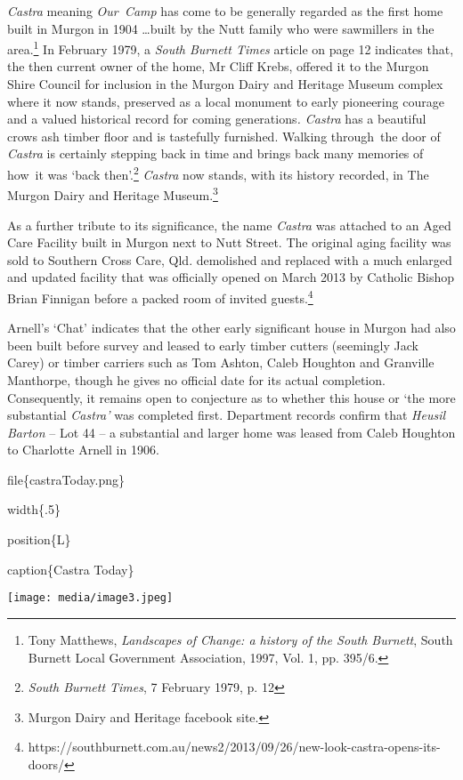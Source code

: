 \emph{Castra} meaning \emph{Our~Camp} has come to be generally regarded
as the first home built in Murgon in 1904 \ldots built by the Nutt
family who were sawmillers in the area.\footnote{Tony Matthews,
  \emph{Landscapes of Change: a history of the South Burnett}, South
  Burnett Local Government Association, 1997, Vol. 1, pp. 395/6.} In
February 1979, a \emph{South Burnett Times} article on page 12 indicates
that, the then current owner of the home, Mr Cliff Krebs, offered it to
the Murgon Shire Council for inclusion in the Murgon Dairy and Heritage
Museum complex where it now stands, preserved as a local monument to
early pioneering courage and a valued historical record for coming
generations\emph{. Castra} has a beautiful crows ash timber floor and is
tastefully furnished. Walking through~the door of \emph{Castra} is
certainly stepping back in time and brings back many memories of how~it
was `back then'.\footnote{\emph{South Burnett Times}, 7 February 1979,
  p. 12} \emph{Castra} now stands, with its history recorded, in The
Murgon Dairy and Heritage Museum.\footnote{Murgon Dairy and Heritage
  facebook site.}

As a further tribute to its significance, the name \emph{Castra} was
attached to an Aged Care Facility built in Murgon next to Nutt Street.
The original aging facility was sold to Southern Cross Care, Qld.
demolished and replaced with a much enlarged and updated facility that
was officially opened on March 2013 by Catholic Bishop Brian Finnigan
before a packed room of invited guests.\footnote{https://southburnett.com.au/news2/2013/09/26/new-look-castra-opens-its-doors/}

Arnell's `Chat' indicates that the other early significant house in
Murgon had also been built before survey and leased to early timber
cutters (seemingly Jack Carey) or timber carriers such as Tom Ashton,
Caleb Houghton and Granville Manthorpe, though he gives no official date
for its actual completion. Consequently, it remains open to conjecture
as to whether this house or `the more substantial \emph{Castra'} was
completed first. Department records confirm that \emph{Heusil Barton} --
Lot 44 -- a substantial and larger home was leased from Caleb Houghton
to Charlotte Arnell in 1906.

file\{castraToday.png\}

width\{.5\}

position\{L\}

caption\{Castra Today\}

\texttt{[image: media/image3.jpeg]}

